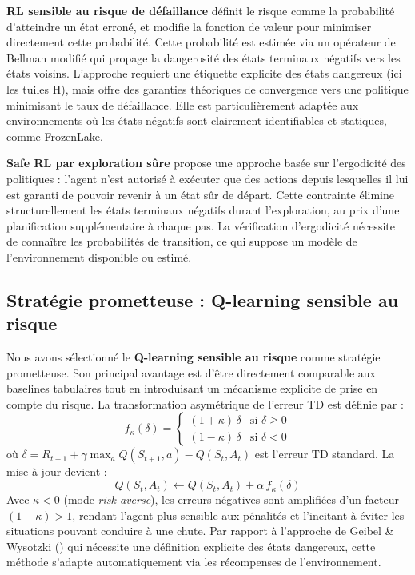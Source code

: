 \documentclass{article}
\begin{document}
\textbf{RL sensible au risque de défaillance} \citep{geibel2005risksensitive} définit le risque comme la probabilité d'atteindre un état erroné, et modifie la fonction de valeur pour minimiser directement cette probabilité. Cette probabilité est estimée via un opérateur de Bellman modifié qui propage la dangerosité des états terminaux négatifs vers les états voisins. L'approche requiert une étiquette explicite des états dangereux (ici les tuiles H), mais offre des garanties théoriques de convergence vers une politique minimisant le taux de défaillance. Elle est particulièrement adaptée aux environnements où les états négatifs sont clairement identifiables et statiques, comme FrozenLake.

\textbf{Safe RL par exploration sûre} \citep{moldovan2012safe} propose une approche basée sur l'ergodicité des politiques : l'agent n'est autorisé à exécuter que des actions depuis lesquelles il lui est garanti de pouvoir revenir à un état sûr de départ. Cette contrainte élimine structurellement les états terminaux négatifs durant l'exploration, au prix d'une planification supplémentaire à chaque pas. La vérification d'ergodicité nécessite de connaître les probabilités de transition, ce qui suppose un modèle de l'environnement disponible ou estimé.

\subsection{Stratégie prometteuse : Q-learning sensible au risque}

Nous avons sélectionné le \textbf{Q-learning sensible au risque} \citep{mihatsch2002risksensitive} comme stratégie prometteuse. Son principal avantage est d'être directement comparable aux baselines tabulaires tout en introduisant un mécanisme explicite de prise en compte du risque. La transformation asymétrique de l'erreur TD est définie par :
\begin{equation}
f_\kappa(\delta) =
\begin{cases}
(1 + \kappa)\,\delta & \text{si } \delta \geq 0 \\
(1 - \kappa)\,\delta & \text{si } \delta < 0
\end{cases}
\label{eq:risktransform}
\end{equation}
où $\delta = R_{t+1} + \gamma \max_a Q(S_{t+1}, a) - Q(S_t, A_t)$ est l'erreur TD standard. La mise à jour devient :
\begin{equation}
Q(S_t, A_t) \leftarrow Q(S_t, A_t) + \alpha\, f_\kappa(\delta)
\label{eq:riskql}
\end{equation}
Avec $\kappa < 0$ (mode \textit{risk-averse}), les erreurs négatives sont amplifiées d'un facteur $(1 - \kappa) > 1$, rendant l'agent plus sensible aux pénalités et l'incitant à éviter les situations pouvant conduire à une chute. Par rapport à l'approche de Geibel \& Wysotzki (\citeyear{geibel2005risksensitive}) qui nécessite une définition explicite des états dangereux, cette méthode s'adapte automatiquement via les récompenses de l'environnement.
\end{document}
